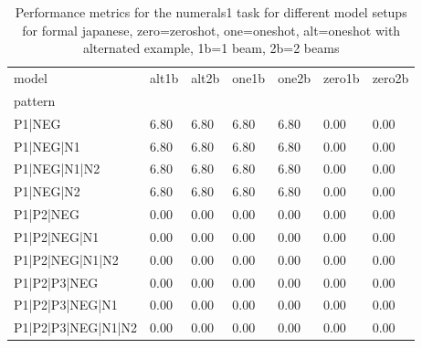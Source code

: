 \begin{table}[h]
\begin{tabular}{l|llllll}
\toprule
model & alt1b & alt2b & one1b & one2b & zero1b & zero2b \\
pattern &  &  &  &  &  &  \\
\midrule
P1|NEG & 6.80 & 6.80 & 6.80 & 6.80 & 0.00 & 0.00 \\
P1|NEG|N1 & 6.80 & 6.80 & 6.80 & 6.80 & 0.00 & 0.00 \\
P1|NEG|N1|N2 & 6.80 & 6.80 & 6.80 & 6.80 & 0.00 & 0.00 \\
P1|NEG|N2 & 6.80 & 6.80 & 6.80 & 6.80 & 0.00 & 0.00 \\
P1|P2|NEG & 0.00 & 0.00 & 0.00 & 0.00 & 0.00 & 0.00 \\
P1|P2|NEG|N1 & 0.00 & 0.00 & 0.00 & 0.00 & 0.00 & 0.00 \\
P1|P2|NEG|N1|N2 & 0.00 & 0.00 & 0.00 & 0.00 & 0.00 & 0.00 \\
P1|P2|P3|NEG & 0.00 & 0.00 & 0.00 & 0.00 & 0.00 & 0.00 \\
P1|P2|P3|NEG|N1 & 0.00 & 0.00 & 0.00 & 0.00 & 0.00 & 0.00 \\
P1|P2|P3|NEG|N1|N2 & 0.00 & 0.00 & 0.00 & 0.00 & 0.00 & 0.00 \\
\bottomrule
\end{tabular}
\caption{Performance metrics for the numerals1 task for different model setups for formal japanese, zero=zeroshot, one=oneshot, alt=oneshot with alternated example, 1b=1 beam, 2b=2 beams}
\label{tab:ja form_numerals1_performance}
\end{table}
